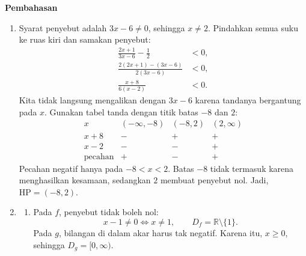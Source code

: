 \documentclass[10pt,letterpaper]{article}
\newcommand{\R}{\mathbb{R}}
\begin{document}
\newpage
\begingroup
\fontsize{10.95}{13.5}\selectfont
\setlength{\parskip}{3pt}
\textbf{\large Pembahasan}\par\medskip
\begin{enumerate}

  \item Syarat penyebut adalah $3x-6\ne0$, sehingga $x\ne2$.
        Pindahkan semua suku ke ruas kiri dan samakan penyebut:
        \begin{align*}
          \frac{2x+1}{3x-6}-\frac12      & <0, \\
          \frac{2(2x+1)-(3x-6)}{2(3x-6)} & <0, \\
          \frac{x+8}{6(x-2)}             & <0.
        \end{align*}
        Kita tidak langsung mengalikan dengan $3x-6$ karena tandanya bergantung pada $x$.
        Gunakan tabel tanda dengan titik batas $-8$ dan $2$:
        \[
          \begin{array}{c|ccc}
            x              & (-\infty,-8) & (-8,2) & (2,\infty) \\ \hline
            x+8            & -            & +      & +          \\
            x-2            & -            & -      & +          \\ \hline
            \text{pecahan} & +            & -      & +
          \end{array}
        \]
        Pecahan negatif hanya pada $-8<x<2$.
        Batas $-8$ tidak termasuk karena menghasilkan kesamaan, sedangkan $2$ membuat penyebut nol.
        Jadi, $\boxed{\mathrm{HP}=(-8,2)}$.

  \item \begin{enumerate}
          \item Pada $f$, penyebut tidak boleh nol:
                \[
                  x-1\ne0\iff x\ne1,
                  \qquad\boxed{D_f=\R\setminus\{1\}}.
                \]
                Pada $g$, bilangan di dalam akar harus tak negatif.
                Karena itu, $x\ge0$, sehingga $\boxed{D_g=[0,\infty)}$.


\end{enumerate}
\end{enumerate}
\end{document}
